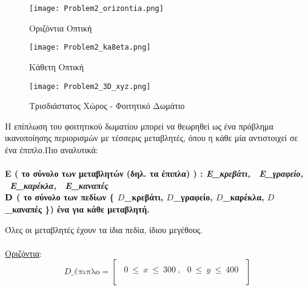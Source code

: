 \documentclass[10pt]{article}
\begin{document}
\vspace{5mm}

\begin{figure}[!htb]
   \begin{minipage}{0.48\textwidth}
     \centering
     \texttt{[image: Problem2\_orizontia.png]}
     \caption{Οριζόντια Οπτική}\label{Fig:Data1}
   \end{minipage}\hfill
   \begin{minipage}{0.48\textwidth}
     \centering
     \texttt{[image: Problem2\_ka8eta.png]}
     \caption{Κάθετη Οπτική}\label{Fig:Data2}
   \end{minipage}
\end{figure}

\vspace{7mm}

\begin{figure}[H]
    \texttt{[image: Problem2\_3D\_xyz.png]}\\
    \caption{Τρισδιάστατος Χώρος - Φοιτητικό Δωμάτιο}
\end{figure} 

Η επίπλωση του φοιτητικού δωματίου μπορεί να θεωρηθεί ως ένα πρόβλημα ικανοποίησης περιορισμών με τέσσερις μεταβλητές, όπου η κάθε μία αντιστοιχεί σε ένα έπιπλο.Πιο αναλυτικά: \\ \\

\bf Ε \normalfont ( το σύνολο των μεταβλητών (δηλ. τα έπιπλα) ) : \textit{ Ε\_{κρεβάτι}, \ Ε\_{γραφείο}, \ Ε\_{καρέκλα}, \ Ε\_{καναπές} } \\


$\bf D$ \normalfont ( το σύνολο των πεδίων \{  $D$\_κρεβάτι, $D$\_γραφείο, $D$\_καρέκλα, $D$\_καναπές \}) ένα για κάθε μεταβλητή.

\hspace{5mm}Όλες οι μεταβλητές έχουν τα ίδια πεδία, ίδιου μεγέθους. \\ \\

\hspace{20mm}\underline{Oριζόντια}:
\[  D\text{\_έπιπλο} =
\left[ 
\begin{array}{ll}
\\
     \ \  0 \ \leq \ x \ \leq \ 300 \ , \ \ \ 0 \ \leq \ y \ \leq \ 400 \ \
     \\ \\
     \end{array} 
\right ] \] 
\\ \\
\end{document}

